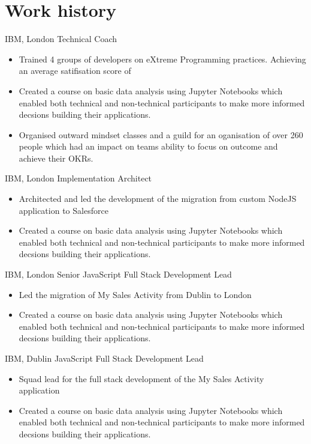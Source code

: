\section[\faGears]{Work history}
{IBM, London}
{Technical Coach}
{\begin{itemize}
		\item Trained 4 groups of developers on eXtreme Programming practices. Achieving an average satifisation score of
		\item Created a course on basic data analysis using Jupyter Notebooks which enabled both technical and non-technical participants to make more informed decsions building their applications.
		\item Organised outward mindset classes and a guild for an oganisation of over 260 people which had an impact on teams ability to focus on outcome and achieve their OKRs.
	\end{itemize}}
{IBM, London}
{Implementation Architect}
{\begin{itemize}
		\item Architected and led the development of the migration from custom NodeJS application to Salesforce
		\item Created a course on basic data analysis using Jupyter Notebooks which enabled both technical and non-technical participants to make more informed decsions building their applications.
	\end{itemize}}
{IBM, London}
{Senior JavaScript Full Stack \newline
	Development Lead}
{\begin{itemize}
		\item Led the migration of My Sales Activity from Dublin to London
		\item Created a course on basic data analysis using Jupyter Notebooks which enabled both technical and non-technical participants to make more informed decsions building their applications.
	\end{itemize}}
{IBM, Dublin}
{JavaScript Full Stack Development \newline
	Lead}
{\begin{itemize}
		\item Squad lead for the full stack development of the My Sales Activity application
		\item Created a course on basic data analysis using Jupyter Notebooks which enabled both technical and non-technical participants to make more informed decsions building their applications.
	\end{itemize}}

